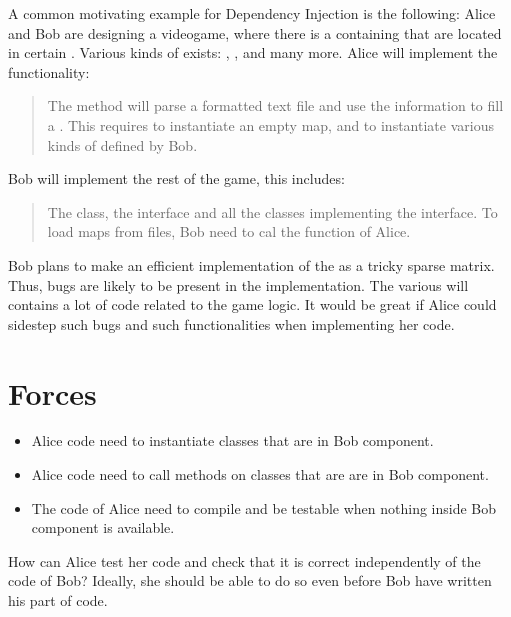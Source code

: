 \documentclass[submission,copyright,creativecommons]{eptcs}
\begin{document}
A common motivating example for Dependency Injection is the following:
Alice and Bob are designing a videogame, where there
is a \Q@Map@ containing \Q@Item@s that are located in certain
\Q@Point@s.
Various kinds of \Q@Item@s exists: \Q@Wall@s, \Q@Rock@s,
\Q@Tree@s and many more.
Alice will implement the \Q@load@ functionality:
\begin{quote}
The \Q@load@ method will parse a formatted text file
and use the information to fill a \Q@Map@.
This requires to instantiate an empty map, and to instantiate various kinds of
\Q@Item@s defined by Bob.
\end{quote}
Bob will implement the rest of the game, this includes: 
\begin{quote}
The \Q@Map@ class, the interface \Q@Item@ and
all the classes implementing the \Q@Item@ interface.
To load maps from files, Bob need to cal the \Q@load@ function of Alice.
\end{quote}
Bob plans to make an efficient implementation of the \Q@Map@ as a tricky
sparse matrix.
Thus, bugs are likely to be present in the \Q@Map@ implementation.
The various \Q@Item@s will contains a lot of code related to the game logic.
It would be great if Alice could sidestep such bugs and such functionalities when
implementing her code.

\section{Forces}
\begin{itemize}
\item Alice code need to instantiate classes that are in Bob component.
\item Alice code need to call methods on classes that are are in Bob component.
\item The code of Alice need to compile and be testable when nothing
inside Bob component is available.
\end{itemize}

How can Alice test her code and check that it is correct independently 
of the code of Bob?
Ideally, she should be able to do so even before Bob have written
his part of code.
\end{document}

